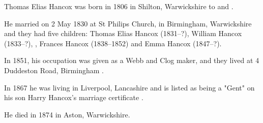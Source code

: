 
Thomas Elias Hancox was born in 1806 in Shilton, Warwickshire \cite{TEHancoxBirth} to  and .

He married  on 2  May 1830 at St Philips Church, in Birmingham, Warwickshire and they had five children: Thomas Elias Hancox (1831--?), William Hancox (1833--?), , Frances Hancox (1838--1852) and Emma Hancox (1847--?).

In 1851, his occupation was given as a Webb and Clog maker, and they lived at 4 Duddeston Road, Birmingham \cite{TEHancoxOccupation}.

In 1867 he was living in Liverpool, Lancashire and is listed as being a "Gent" on his son Harry Hancox's marriage certificate \cite{TEHancox1867}.

He died in 1874 in Aston, Warwickshire.\cite{PeterKarpinski_2016-04-04}
